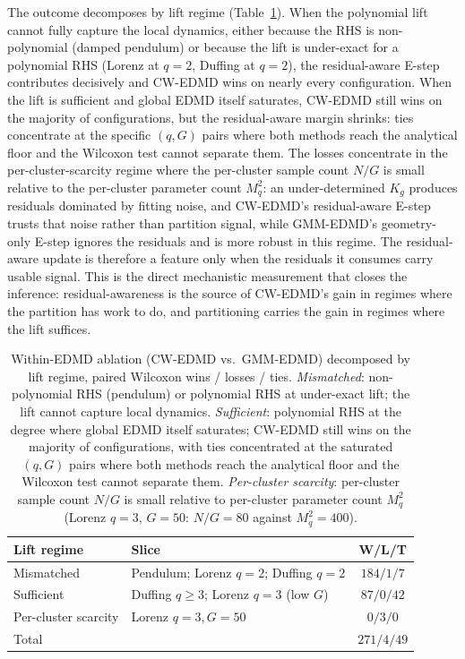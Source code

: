 \documentclass{article}
\begin{document}
The outcome decomposes by lift regime (Table~\ref{tab:within-edmd-regimes}). When the polynomial lift cannot fully capture the local dynamics, either because the RHS is non-polynomial (damped pendulum) or because the lift is under-exact for a polynomial RHS (Lorenz at $q{=}2$, Duffing at $q{=}2$), the residual-aware E-step contributes decisively and CW-EDMD wins on nearly every configuration. When the lift is sufficient and global EDMD itself saturates, CW-EDMD still wins on the majority of configurations, but the residual-aware margin shrinks: ties concentrate at the specific $(q, G)$ pairs where both methods reach the analytical floor and the Wilcoxon test cannot separate them. The losses concentrate in the per-cluster-scarcity regime where the per-cluster sample count $N/G$ is small relative to the per-cluster parameter count $M_q^2$: an under-determined $K_g$ produces residuals dominated by fitting noise, and CW-EDMD's residual-aware E-step trusts that noise rather than partition signal, while GMM-EDMD's geometry-only E-step ignores the residuals and is more robust in this regime. The residual-aware update is therefore a feature only when the residuals it consumes carry usable signal. This is the direct mechanistic measurement that closes the inference: residual-awareness is the source of CW-EDMD's gain in regimes where the partition has work to do, and partitioning carries the gain in regimes where the lift suffices.

\begin{table}[H]
\centering\footnotesize
\caption{Within-EDMD ablation (CW-EDMD vs.\ GMM-EDMD) decomposed by lift regime, paired Wilcoxon wins / losses / ties. \emph{Mismatched}: non-polynomial RHS (pendulum) or polynomial RHS at under-exact lift; the lift cannot capture local dynamics. \emph{Sufficient}: polynomial RHS at the degree where global EDMD itself saturates; CW-EDMD still wins on the majority of configurations, with ties concentrated at the saturated $(q, G)$ pairs where both methods reach the analytical floor and the Wilcoxon test cannot separate them. \emph{Per-cluster scarcity}: per-cluster sample count $N/G$ is small relative to per-cluster parameter count $M_q^2$ (Lorenz $q{=}3$, $G{=}50$: $N/G = 80$ against $M_q^2 = 400$).}
\label{tab:within-edmd-regimes}
\begin{tabular}{llc}
\toprule
Lift regime  & Slice                                       & W/L/T \\
\midrule
Mismatched   & Pendulum; Lorenz $q{=}2$; Duffing $q{=}2$    & $184/1/7$ \\
Sufficient   & Duffing $q{\geq}3$; Lorenz $q{=}3$ (low $G$) & $87/0/42$ \\
Per-cluster scarcity  & Lorenz $q{=}3, G{=}50$                & $0/3/0$ \\
\midrule
Total        &                                              & $271/4/49$ \\
\bottomrule
\end{tabular}
\end{table}
\end{document}
